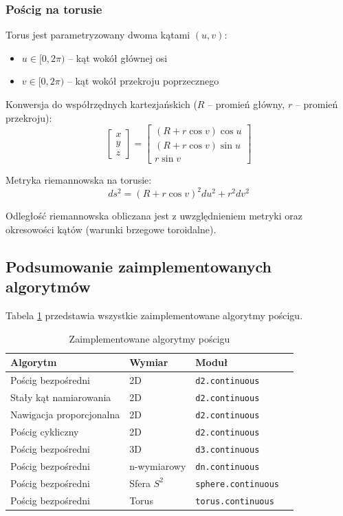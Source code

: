 \documentclass[12pt,a4paper]{article}
\begin{document}
\subsubsection{Pościg na torusie}

Torus jest parametryzowany dwoma kątami $(u, v)$:
\begin{itemize}
    \item $u \in [0, 2\pi)$ -- kąt wokół głównej osi
    \item $v \in [0, 2\pi)$ -- kąt wokół przekroju poprzecznego
\end{itemize}

Konwersja do współrzędnych kartezjańskich ($R$ -- promień główny, $r$ -- promień przekroju):
\begin{equation}
\begin{bmatrix} x \\ y \\ z \end{bmatrix} = \begin{bmatrix} (R + r\cos v) \cos u \\ (R + r\cos v) \sin u \\ r \sin v \end{bmatrix}
\end{equation}

Metryka riemannowska na torusie:
\begin{equation}
ds^2 = (R + r\cos v)^2 du^2 + r^2 dv^2
\end{equation}

Odległość riemannowska obliczana jest z uwzględnieniem metryki oraz okresowości kątów (warunki brzegowe toroidalne).

\subsection{Podsumowanie zaimplementowanych algorytmów}

Tabela \ref{tab:algorithms} przedstawia wszystkie zaimplementowane algorytmy pościgu.

\begin{table}[H]
\centering
\caption{Zaimplementowane algorytmy pościgu}
\label{tab:algorithms}
\begin{tabular}{@{}llll@{}}
\toprule
\textbf{Algorytm} & \textbf{Wymiar} & \textbf{Moduł} \\ \midrule
Pościg bezpośredni & 2D & \texttt{d2.continuous} \\
Stały kąt namiarowania & 2D & \texttt{d2.continuous} \\
Nawigacja proporcjonalna & 2D & \texttt{d2.continuous} \\
Pościg cykliczny & 2D & \texttt{d2.continuous} \\
Pościg bezpośredni & 3D & \texttt{d3.continuous} \\
Pościg bezpośredni & n-wymiarowy & \texttt{dn.continuous} \\
Pościg bezpośredni & Sfera $S^2$ & \texttt{sphere.continuous} \\
Pościg bezpośredni & Torus & \texttt{torus.continuous} \\ \bottomrule
\end{tabular}
\end{table}
\end{document}
